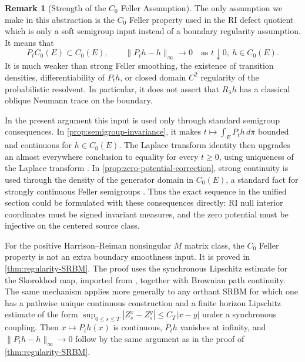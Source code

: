 \documentclass[aihp]{imsart}
\numberwithin{equation}{section}
\theoremstyle{plain}
\theoremstyle{definition}
\newtheorem{remark}[remark]{Remark}
\newcommand{\1}{\mathbf 1}
\begin{document}
\begin{remark}[Strength of the $C_0$ Feller Assumption]\label{rem:C0-Feller-strength} The only assumption we make in this abstraction is the $C_0$ Feller property used in the RI defect quotient which is only a soft
semigroup input instead of a boundary regularity assumption.  It means that
\[
        P_t C_0(E)\subset C_0(E),
        \qquad
        \|P_t h-h\|_\infty\to0
        \quad\text{as }t\downarrow0,\ h\in C_0(E).
\]
It is much weaker than strong Feller smoothing, the existence of transition
densities, differentiability of $P_t h$, or closed domain $C^2$ regularity of
the probabilistic resolvent.  In particular, it does not assert that
$R_\lambda h$ has a classical oblique Neumann trace on the boundary.

In the present argument this input is used only through standard semigroup
consequences.  In \cref{prop:semigroup-invariance}, it makes $ t\longmapsto \int_E P_t h\,d\bar\pi$ bounded and continuous for \(h\in C_0(E)\).  The Laplace transform identity
then upgrades an almost everywhere conclusion to equality for every
\(t\ge0\), using uniqueness of the Laplace transform
\cite[Chapter~II]{Doetsch1974}.  In \cref{prop:zero-potential-correction},
strong continuity is used through the density of the generator domain in
\(C_0(E)\), a standard fact for strongly continuous Feller semigroups
\cite[Chapter~1, Section~2]{EthierKurtz1986}.  Thus the exact sequence in
the unified section could be formulated with these consequences directly:
RI null interior coordinates must be signed invariant measures, and the
zero potential must be injective on the centered source class.

For the positive Harrison--Reiman nonsingular \(M\) matrix class, the
\(C_0\) Feller property is not an extra boundary smoothness input.
It is proved in \cref{thm:regularity-SRBM}.  The proof uses the synchronous
Lipschitz estimate for the Skorokhod map, imported from
\cite[Proposition~2.6]{LipshutzRamanan2019}, together with Brownian path
continuity.  The same mechanism applies more generally to any orthant SRBM
for which one has a pathwise unique continuous construction and a finite
horizon Lipschitz estimate of the form $\sup_{0\le s\le T}|Z_s^x-Z_s^y|
        \le C_T |x-y|$ under a synchronous coupling.  Then \(x\mapsto P_t h(x)\) is continuous,
\(P_t h\) vanishes at infinity, and \(\|P_t h-h\|_\infty\to0\) follow by
the same argument as in the proof of \cref{thm:regularity-SRBM}.


\end{remark}
\end{document}
